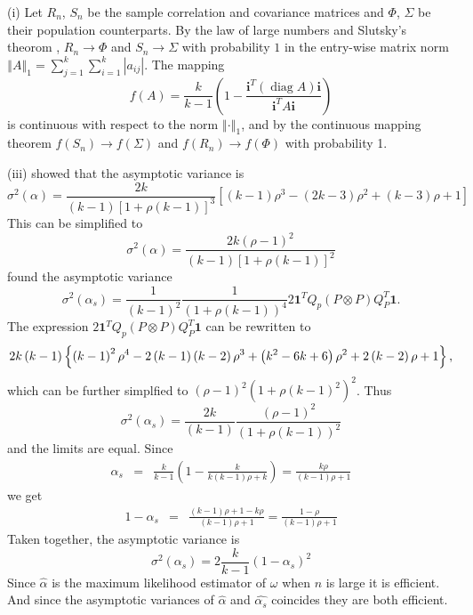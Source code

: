 \documentclass{article}
\makeatletter
\theoremstyle{plain}
\theoremstyle{plain}
\theoremstyle{definition}
\theoremstyle{remark}
\theoremstyle{definition}
\theoremstyle{plain}
\theoremstyle{plain}
\theoremstyle{definition}
\newenvironment{proof}[1][\protect\proofname]{\par
	\normalfont\topsep6\p@\@plus6\p@\relax
	\trivlist
	\itemindent\parindent
	\item[\hskip\labelsep\scshape #1]\ignorespaces
}{%
	\endtrivlist\@endpefalse
}
\providecommand{\proofname}{Proof}
\DeclareMathOperator{\diag}{diag}
\makeatother
\begin{document}
\begin{proof}[Proof of Theorem \ref{thm:asymptotics}]\label{proof:asymptotics}
(i) Let $R_{n}$, $S_{n}$ be the sample correlation and covariance matrices
and $\Phi$, $\Sigma$ be their population counterparts. By the law
of large numbers and Slutsky's theorom \citep[][Lemma 2.8, p. 11]{Van_der_Vaart2000-qc}, $R_{n}\to\Phi$ and $S_{n}\to\Sigma$
with probability $1$ in the entry-wise matrix norm $\left\Vert A\right\Vert _{1}=\sum_{j=1}^{k}\sum_{i=1}^{k}\left|a_{ij}\right|$.
The mapping
\[
f\left(A\right)=\frac{k}{k-1}\left(1-\frac{\mathbf{i}^{T}(\diag A)\mathbf{i}}{\mathbf{i}^{T}A\mathbf{i}}\right)
\]
is continuous with respect to the norm $\left\Vert \cdot\right\Vert _{1}$,
and by the continuous mapping theorem \citep[][Theorem 2.3, p. 7]{Van_der_Vaart2000-qc}
$f\left(S_{n}\right)\to f\left(\Sigma\right)$ and $f\left(R_{n}\right)\to f\left(\Phi\right)$
with probability 1.

(iii) \citet[eq. 22]{Van_Zyl2000-si} showed that the asymptotic variance
is
\[
\sigma^{2}\left(\alpha\right)=\frac{2k}{\left(k-1\right)\left[1+\rho\left(k-1\right)\right]^{3}}\left[\left(k-1\right)\rho^{3}-\left(2k-3\right)\rho^{2}+\left(k-3\right)\rho+1\right]
\]
This can be simplified to
\[
\sigma^{2}\left(\alpha\right)=\frac{2k\left(\rho-1\right)^{2}}{\left(k-1\right)\left[1+\rho\left(k-1\right)\right]^{2}}
\]
\citet[equation 10]{hayashi2005note} found the asymptotic variance
\[
\sigma^{2}\left(\alpha_{s}\right)=\frac{1}{\left(k-1\right)^{2}}\frac{1}{\left(1+\rho\left(k-1\right)\right)^{4}}2\mathbf{1}^{T}Q_{p}\left(P\otimes P\right)Q_{P}^{T}\mathbf{1}.
\]
The expression $2\mathbf{1}^{T}Q_{p}\left(P\otimes P\right)Q_{P}^{T}\mathbf{1}$
can be rewritten to \citep[appendix 3]{hayashi2005note}
\[
2k\left(k-1\right)\left\{ \left(k-1\right)^{2}\rho^{4}-2\left(k-1\right)\left(k-2\right)\rho^{3}+\left(k^{2}-6k+6\right)\text{\ensuremath{\rho^{2}+2\left(k-2\right)\rho+1}}\right\} ,
\]
which can be further simplfied to $\left(\rho-1\right)^{2}\left(1+\rho\left(k-1\right)^{2}\right)^{2}$.
Thus
\[
\sigma^{2}\left(\alpha_{s}\right)=\frac{2k}{\left(k-1\right)}\frac{\left(\rho-1\right)^{2}}{\left(1+\rho\left(k-1\right)\right)^{2}}
\]
and the limits are equal.
Since
\begin{eqnarray*}
\alpha_{s} & = & \frac{k}{k-1}\left(1-\frac{k}{k\left(k-1\right)\rho+k}\right) = \frac{k\rho}{\left(k-1\right)\rho+1}
\end{eqnarray*}
we get
\begin{eqnarray*}
1-\alpha_{s} & = & \frac{\left(k-1\right)\rho+1-k\rho}{\left(k-1\right)\rho+1} = \frac{1-\rho}{\left(k-1\right)\rho+1}
\end{eqnarray*}
Taken together, the asymptotic variance is
\[
\sigma^{2}\left(\alpha_{s}\right)=2\frac{k}{k-1}\left(1-\alpha_{s}\right)^{2}
\]
Since $\widehat{\alpha}$ is the maximum likelihood estimator of $\omega$
when $n$ is large it is efficient. And since the asymptotic variances
of $\widehat{\alpha}$ and $\widehat{\alpha_{s}}$ coincides they
are both efficient.
\end{proof}
\end{document}

